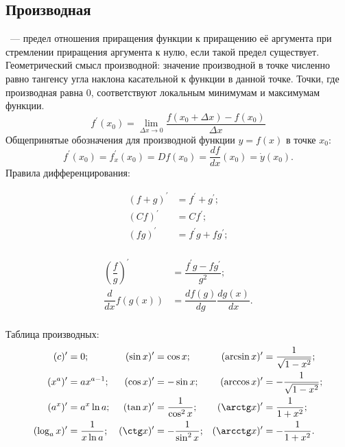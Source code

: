 \subsection{Производная}
~--- предел отношения приращения функции к приращению её аргумента при стремлении приращения аргумента к нулю, если такой предел существует. Геометрический смысл производной: значение производной в точке численно равно тангенсу угла наклона касательной к функции в данной точке. Точки, где производная равна 0, соответствуют локальным минимумам и максимумам функции.
\begin{equation}
f^\prime(x_0) = \lim_{\Delta x \to 0}\frac{f(x_0 + \Delta x) - f(x_0)}{\Delta x}
\end{equation}
Общепринятые обозначения для производной функции $y = f(x)$ в точке $x_0$:
\begin{equation}
f^\prime(x_0) = f^\prime_x(x_0) = D f(x_0) = \frac{d f}{d x}(x_0) = \dot{y} (x_0).
\end{equation}
Правила дифференцирования:\\
\begin{minipage}{0.5\textwidth}
\begin{align*}
(f+g)^\prime &= f^\prime + g^\prime;\\
(Cf)^\prime &= Cf^\prime;\\
(fg)^\prime &= f^\prime g + f g^\prime;\\
\end{align*}
\end{minipage}
\begin{minipage}{0.5\textwidth}
\begin{align*}
\left(\dfrac{f}{g}\right)^\prime &= \dfrac{f^\prime g - f g^\prime}{g^2};\\
\dfrac{d}{dx}f(g(x)) &= \dfrac{df(g)}{dg}\dfrac{dg(x)}{dx}.\\
\end{align*}
\end{minipage}
Таблица производных:
\begin{align*}
(c)^\prime &= 0; 
& (\sin x)^\prime &= \cos x; 
& (\arcsin x)^\prime &= 
\dfrac{1}{\sqrt{1 - x^2}}; \\
(x^a)^\prime &= a x^{a-1}; 
& (\cos x)^\prime &= - \sin x; 
& (\arccos x)^\prime &= - \dfrac{1}{\sqrt{1 - x^2}}; \\
(a^x)^\prime &= a^x \ln a; & (\tan x)^\prime &= \dfrac{1}{\cos^2 x}; 
& (\arctg x)^\prime &= \dfrac{1}{1 + x^2}; \\
(\log_a x)^\prime &= \dfrac{1}{x \ln a}; 
& (\ctg x)^\prime &= - \dfrac{1}{\sin^2 x}; 
& (\arcctg x)^\prime &= - \dfrac{1}{1 + x^2}.
\end{align*}

